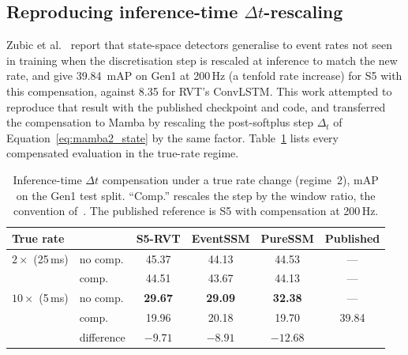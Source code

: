 \documentclass[11pt, a4paper]{report}
\begin{document}
\subsection{Reproducing inference-time \texorpdfstring{$\Delta t$}{Delta t}-rescaling}
\label{subsec:f2}
Zubic et al.~\cite{zubic2024state} report that state-space detectors generalise to event rates not seen
in training when the discretisation step is rescaled at inference to match the new rate, and give
39.84~mAP on Gen1 at 200\,Hz (a tenfold rate increase) for S5 with this compensation, against 8.35 for
RVT's ConvLSTM. This work attempted to reproduce that result with the published checkpoint and code, and
transferred the compensation to Mamba by rescaling the post-softplus step $\Delta_t$ of
Equation~\eqref{eq:mamba2_state} by the same factor. Table~\ref{tab:dt_comp} lists every compensated
evaluation in the true-rate regime.

\begin{table}[htbp]
\centering
\caption{Inference-time $\Delta t$ compensation under a true rate change (regime~2), mAP on the Gen1
test split. ``Comp.'' rescales the step by the window ratio, the convention of~\cite{zubic2024state}.
The published reference is S5 with compensation at 200\,Hz.}
\label{tab:dt_comp}
\begin{tabular}{llcccc}
\toprule
True rate & & \textbf{S5-RVT} & \textbf{EventSSM} & \textbf{PureSSM} & Published \\
\midrule
$2\times$ (25\,ms)  & no comp.  & 45.37 & 44.13 & 44.53 & --- \\
                    & comp.     & 44.51 & 43.67 & 44.13 & --- \\
\midrule
$10\times$ (5\,ms)  & no comp.  & \textbf{29.67} & \textbf{29.09} & \textbf{32.38} & --- \\
                    & comp.     & 19.96 & 20.18 & 19.70 & 39.84 \\
                    & difference & $-9.71$ & $-8.91$ & $-12.68$ & \\
\bottomrule
\end{tabular}
\end{table}
\end{document}
